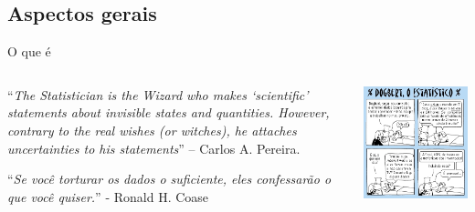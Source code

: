 \documentclass{beamer}
\begin{document}
\subsection{Aspectos gerais}

\begin{frame}{\scriptsize O que é}
  \begin{columns}
    \begin{column}{7cm}
      \begin{block}{}
        {\scriptsize ``{\em The Statistician is the Wizard who makes
            `scientific' statements about invisible states and
            quantities. However, contrary to the real wishes (or
            witches), he attaches uncertainties to his statements}'' –
          Carlos A.  Pereira.}
      \end{block}
      \begin{block}{}
        {\scriptsize ``{\em Se você torturar os dados o suficiente,
            eles confessarão o que você quiser.}'' - Ronald H. Coase}
      \end{block}

    \end{column}
    \begin{column}{3cm}
      \begin{center}
        \includegraphics[width=1.6\textwidth]{Cap1/dilbert}
      \end{center}
    \end{column}
  \end{columns}
\end{frame}
\end{document}
